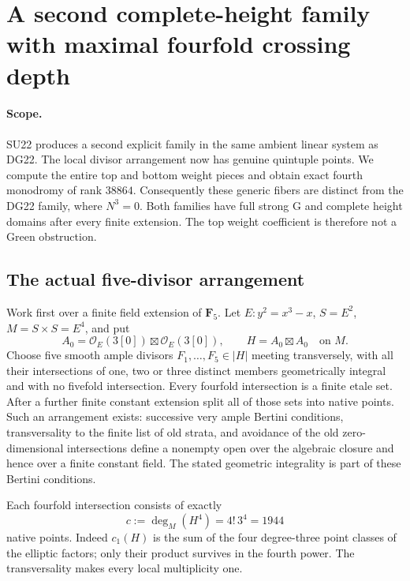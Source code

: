 \section{A second complete-height family with maximal fourfold crossing depth}
\label{r22sq:section}

\paragraph{Scope.}
SU22 produces a second explicit family in the same ambient linear
system as DG22.  The local divisor arrangement now has genuine
quintuple points.  We compute the entire top and bottom weight
pieces and obtain exact fourth monodromy of rank $38864$.
Consequently these generic fibers are distinct from the DG22
family, where $N^3=0$.  Both families have full strong G and
complete height domains after every finite extension.  The
top weight coefficient is therefore not a Green obstruction.

\subsection{The actual five-divisor arrangement}

Work first over a finite field extension of $\mathbf F_5$.
Let $E:y^2=x^3-x$, $S=E^2$, $M=S\times S=E^4$, and put
\[
 A_0=\mathcal O_E(3[0])\boxtimes\mathcal O_E(3[0]),\qquad
 H=A_0\boxtimes A_0\quad\text{on }M.
 \tag{SQ22.1}\label{r22sq:H}
\]
Choose five smooth ample divisors $F_1,\ldots,F_5\in|H|$
meeting transversely, with all their intersections of one,
two or three distinct members geometrically integral and
with no fivefold intersection.  Every fourfold intersection
is a finite etale set.  After a further finite constant
extension split all of those sets into native points.
Such an arrangement exists: successive very ample Bertini
conditions, transversality to the finite list of old strata,
and avoidance of the old zero-dimensional intersections
define a nonempty open over the algebraic closure and hence
over a finite constant field.  The stated geometric
integrality is part of these Bertini conditions.

Each fourfold intersection consists of exactly
\[
                 c:=\deg_M(H^4)=4!\,3^4=1944
 \tag{SQ22.2}\label{r22sq:count}
\]
native points.  Indeed $c_1(H)$ is the sum of the four
degree-three point classes of the elliptic factors; only
their product survives in the fourth power.  The transversality
makes every local multiplicity one.


